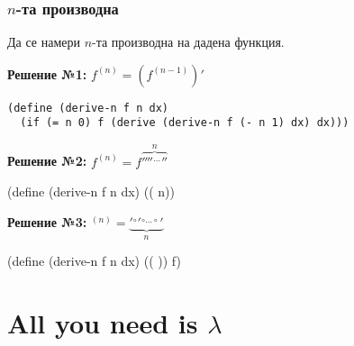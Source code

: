 \documentclass{beamer}
\begin{document}
\begin{frame}[fragile]
  \frametitle{$n$-та производна}

  Да се намери $n$-та производна на дадена функция.

  \vspace{1em}

  \pause

  \textbf{Решение №1:} $f^{(n)} = (f^{(n-1)})'$\pause
\begin{verbatim}
(define (derive-n f n dx)
  (if (= n 0) f (derive (derive-n f (- n 1) dx) dx)))
\end{verbatim}

  \pause

  \textbf{Решение №2:} $f^{(n)} = f\overbrace{''''{}^{\ldots}{}''}^n$\pause
\begin{semiverbatim}
(define (derive-n f n dx)
  ((  n))
\end{semiverbatim}

\pause
  \textbf{Решение №3:} $^{(n)} = \underbrace{{}'{}^\circ{}'{}^{\circ\ldots\circ}{}'}_n$
\begin{semiverbatim}
(define (derive-n f n dx)
  ((      )) f)
\end{semiverbatim}
\end{frame}

\section{All you need is $\lambda$}
\end{document}
